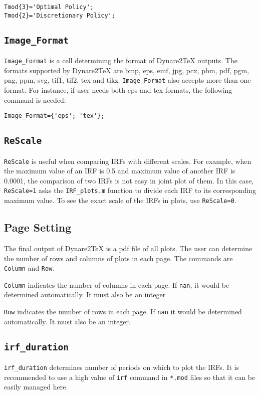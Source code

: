 \documentclass[11pt,a4paper]{article}
\begin{document}
\begin{lstlisting} 
Tmod{3}='Optimal Policy';
Tmod{2}='Discretionary Policy'; 
\end{lstlisting}

\subsection{\texttt{Image_Format}}
\texttt{Image_Format} is a cell determining the format of Dynare2TeX outputs.
The formats supported by Dynare2TeX are bmp, eps, emf, jpg, pcx, pbm, pdf, pgm, png, ppm, svg, tif1, tif2, tex and tikz. \texttt{Image_Format} also accepts more than one format. For instance, if user needs both eps and tex formats, the following command is needed:

\begin{lstlisting} 
Image_Format={'eps'; 'tex'};
\end{lstlisting}
    
\subsection{\texttt{ReScale}}
\texttt{ReScale} is useful when comparing IRFs with different scales. For example, when the maximum value of an IRF is 0.5 and maximum value of another IRF is 0.0001, the comparison of two IRFs is not easy in joint plot of them. In this case, \texttt{ReScale=1} asks the \texttt{IRF\_plots.m} function to divide each IRF to its corresponding maximum value. To see the exact scale of the IRFs in plots, use \texttt{ReScale=0}.
\subsection{Page Setting}
The final output of Dynare2TeX is a pdf file of all plots. The user can determine the number of rows and columns of plots in each page. The commands are \texttt{Column} and \texttt{Row}.
 
\texttt{Column} indicates the number of columns in each page. If \texttt{nan}, it would be determined automatically. It must also be an integer

\texttt{Row} indicates the number of rows in each page. If \texttt{nan} it would be 
determined automatically. It must also be an integer.
\subsection{\texttt{irf_duration}}
\texttt{irf_duration} determines number of periods on which to plot the IRFs. It is recommended to use a high value of \texttt{irf} command in \texttt{*.mod} files so that it can be easily managed here.
\end{document}
